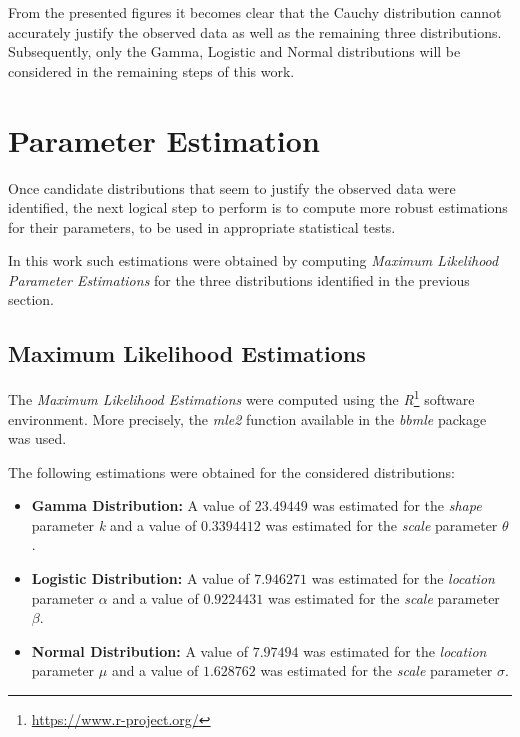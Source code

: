 \documentclass[12pt]{article}
\begin{document}
From the presented figures it becomes clear that the Cauchy distribution cannot accurately justify the observed data as well as the remaining three distributions. Subsequently, only the Gamma, Logistic and Normal distributions will be considered in the remaining steps of this work.

\section{Parameter Estimation}
\label{parameter_estimations}

Once candidate distributions that seem to justify the observed data were identified, the next logical step to perform is to compute more robust estimations for their parameters, to be used in appropriate statistical tests.

In this work such estimations were obtained by computing \emph{Maximum Likelihood Parameter Estimations} for the three distributions identified in the previous section.

\subsection{Maximum Likelihood Estimations}
\label{maximum_likelihood_estimations}

The \emph{Maximum Likelihood Estimations} were computed using the \emph{R}\footnote{\url{https://www.r-project.org/}} software environment. More precisely, the \emph{mle2} function available in the \emph{bbmle} package was used.

The following estimations were obtained for the considered distributions:

\begin{itemize}
	\item \textbf{Gamma Distribution:} A value of $23.49449$ was estimated for the \emph{shape} parameter \emph{k} and a value of $0.3394412$ was estimated for the \emph{scale} parameter \emph{$\theta$}.
	
	\item \textbf{Logistic Distribution:} A value of $7.946271$ was estimated for the \emph{location} parameter \emph{$\alpha$} and a value of $0.9224431$ was estimated for the \emph{scale} parameter \emph{$\beta$}.
		
	\item \textbf{Normal Distribution:} A value of $7.97494$ was estimated for the \emph{location} parameter \emph{$\mu$} and a value of $1.628762$ was estimated for the \emph{scale} parameter \emph{$\sigma$}.
\end{itemize}
\end{document}
